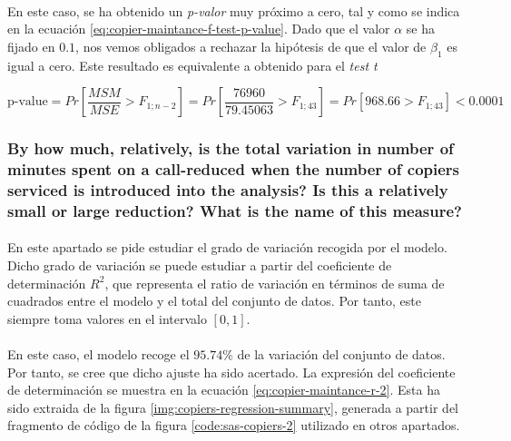 \documentclass{article}
\begin{document}
        \paragraph{}
        En este caso, se ha obtenido un \emph{p-valor} muy próximo a cero, tal y como se indica en la ecuación \eqref{eq:copier-maintance-f-test-p-value}. Dado que el valor $\alpha$ se ha fijado en $0.1$, nos vemos obligados a rechazar la hipótesis de que el valor de $\beta_1$ es igual a cero. Este resultado es equivalente a obtenido para el \emph{test t}

        \begin{equation}
        \label{eq:copier-maintance-f-test-p-value}
          \text{p-value} = Pr\left[\frac{MSM}{MSE} > F_{1;n-2}\right] =
          Pr\left[\frac{76960}{79.45063} > F_{1;43}\right] =
          Pr\left[968.66 > F_{1;43}\right] <
          0.0001
        \end{equation}

      \subsubsection{By how much, relatively, is the total variation in number of minutes spent on a call-reduced when the number of copiers serviced is introduced into the analysis? Is this a relatively small or large reduction? What is the name of this measure?}

        \paragraph{}
        En este apartado se pide estudiar el grado de variación recogida por el modelo. Dicho grado de variación se puede estudiar a partir del coeficiente de determinación $R^2$, que representa el ratio de variación en términos de suma de cuadrados entre el modelo y el total del conjunto de datos. Por tanto, este siempre toma valores en el intervalo $[0,1]$.

        \paragraph{}
        En este caso, el modelo recoge el $95.74\%$ de la variación del conjunto de datos. Por tanto, se cree que dicho ajuste ha sido acertado. La expresión del coeficiente de determinación se muestra en la ecuación \eqref{eq:copier-maintance-r-2}. Esta ha sido extraida de la figura \ref{img:copiers-regression-summary}, generada a partir del fragmento de código de la figura \ref{code:sas-copiers-2} utilizado en otros apartados.
\end{document}
